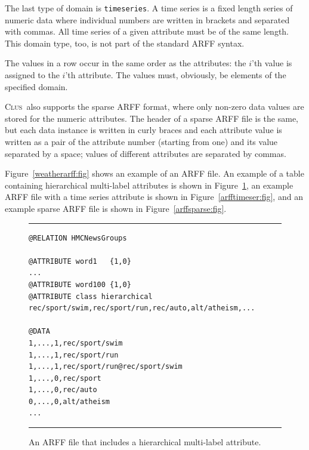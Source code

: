 \documentclass[a4paper]{report}
\newcommand{\clus}{\textsc{Clus}}
\begin{document}
The last type of domain is \texttt{timeseries}. A time series is a fixed length series of numeric data where individual numbers are written in brackets and separated with commas. All time series of a given attribute must be of the same length. This domain type, too, is not part of the standard ARFF syntax.

The values in a	 row occur in the same order as the attributes: the $i$'th value is assigned to the $i$'th attribute.  The values must, obviously, be elements of the specified domain.  

\clus\ also supports the sparse ARFF format, where only non-zero data values are stored for the numeric attributes. The header of a sparse ARFF file is the same, but each data instance is written in curly braces and each attribute value is written as a pair of the attribute number (starting from one) and its value separated by a space; values of different attributes are separated by commas.

Figure~\ref{weatherarff:fig} shows an example of an ARFF file. An example of a table containing hierarchical multi-label attributes is shown in Figure~\ref{arffhmc:fig}, an example ARFF file with a time series attribute is shown in Figure~\ref{arfftimeser:fig}, and an example sparse ARFF file is shown in Figure~\ref{arffsparse:fig}.

\begin{figure}[tb]
\hrule\vspace{1em}
\begin{verbatim}
@RELATION HMCNewsGroups

@ATTRIBUTE word1   {1,0}
...
@ATTRIBUTE word100 {1,0}
@ATTRIBUTE class hierarchical rec/sport/swim,rec/sport/run,rec/auto,alt/atheism,...

@DATA
1,...,1,rec/sport/swim
1,...,1,rec/sport/run
1,...,1,rec/sport/run@rec/sport/swim
1,...,0,rec/sport
1,...,0,rec/auto
0,...,0,alt/atheism
...
\end{verbatim}
\hrule\vspace{1em}
\caption{An ARFF file that includes a hierarchical multi-label attribute.}
\label{arffhmc:fig}
\end{figure}
\end{document}
